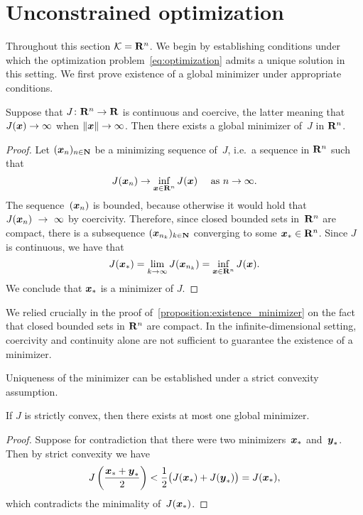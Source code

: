\section{Unconstrained optimization}
\label{sec:unconstrained_optimization}
Throughout this section $\mathcal K = \mathbf R^n$.
We begin by establishing conditions under which the optimization problem~\eqref{eq:optimization} admits a unique solution in this setting.
We first prove existence of a global minimizer under appropriate conditions.
\begin{proposition}
    \label{proposition:existence_minimizer}
    Suppose that $J \colon \mathbf R^n \to \mathbf R$ is continuous and coercive,
    the latter meaning that $J(\mathbf{\boldsymbol{x}}) \to \infty$ when $\lVert\mathbf{\boldsymbol{x}}\rVert \to \infty$.
    Then there exists a global minimizer of~$J$ in $\mathbf R^n$.
\end{proposition}
\begin{proof}
    Let $(\mathbf{\boldsymbol{x}}_n)_{n \in \mathbf N}$ be a minimizing sequence of~$J$,
    i.e.\ a sequence in $\mathbf R^n$ such that
    \[
        J(\mathbf{\boldsymbol{x}}_n) \to \inf_{\mathbf{\boldsymbol{x}} \in \mathbf R^n} J(\mathbf{\boldsymbol{x}}) \quad \text{ as $n \to \infty$}.
    \]
    The sequence~$(\mathbf{\boldsymbol{x}}_n)$ is bounded,
    because otherwise it would hold that $J(\mathbf{\boldsymbol{x}}_n)~\to~\infty$ by coercivity.
    Therefore, since closed bounded sets in~$\mathbf R^n$ are compact,
    there is a subsequence $(\mathbf{\boldsymbol{x}}_{n_k})_{k \in \mathbf N}$ converging to some $\mathbf{\boldsymbol{x}}_* \in \mathbf R^n$.
    Since $J$ is continuous, we have that
    \[
        J(\mathbf{\boldsymbol{x}}_*) = \lim_{k \to \infty} J(\mathbf{\boldsymbol{x}}_{n_k}) = \inf_{\mathbf{\boldsymbol{x}} \in \mathbf R^n} J(\mathbf{\boldsymbol{x}}).
    \]
    We conclude that $\mathbf{\boldsymbol{x}}_*$ is a minimizer of $J$.
\end{proof}
\begin{remark}
    We relied crucially in the proof of~\cref{proposition:existence_minimizer} on the fact that closed bounded sets in $\mathbf R^n$ are compact.
    In the infinite-dimensional setting,
    coercivity and continuity alone are not sufficient to guarantee the existence of a minimizer.
\end{remark}

Uniqueness of the minimizer can be established under a strict convexity assumption.

\begin{proposition}
    \label{proposition:uniqueness_minimizer}
    If $J$ is strictly convex,
    then there exists at most one global minimizer.
\end{proposition}
\begin{proof}
    Suppose for contradiction that there were two minimizers~$\mathbf{\boldsymbol{x}}_*$ and~$\mathbf{\boldsymbol{y}}_*$.
    Then by strict convexity we have
    \[
        J \left( \frac{\mathbf{\boldsymbol{x}}_* + \mathbf{\boldsymbol{y}}_*}{2} \right)
        < \frac{1}{2} \bigl( J(\mathbf{\boldsymbol{x}}_*) + J(\mathbf{\boldsymbol{y}}_*) \bigr) = J(\mathbf{\boldsymbol{x}}_*),
    \]
    which contradicts the minimality of~$J(\mathbf{\boldsymbol{x}}_*)$.
\end{proof}

